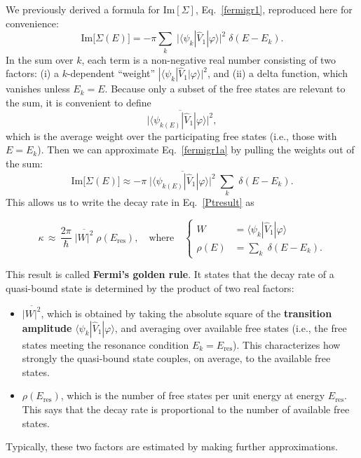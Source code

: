 \documentclass[prx,12pt]{revtex4-2}
\begin{document}
We previously derived a formula for $\mathrm{Im}[\Sigma]$,
Eq.~\eqref{fermigr1}, reproduced here for convenience:
\begin{equation}
  \mathrm{Im}\big[\Sigma(E)\big]
  = - \pi \sum_k \; \big| \langle\psi_k| \hat{V}_1|\varphi\rangle\big|^2
  \; \delta(E-E_k).
  \label{fermigr1a}
\end{equation}
In the sum over $k$, each term is a non-negative real number
consisting of two factors: (i) a $k$-dependent ``weight'' $|
\langle\psi_k| \hat{V}_1|\varphi\rangle|^2$, and (ii) a delta
function, which vanishes unless $E_k = E$.  Because only a subset of
the free states are relevant to the sum, it is convenient to define
\begin{equation*}
  \overline{\big| \langle\psi_{k(E)}| \hat{V}_1|\varphi\rangle\big|^2},
\end{equation*}
which is the average weight over the participating free states (i.e.,
those with $E = E_k$).  Then we can approximate Eq.~\eqref{fermigr1a}
by pulling the weights out of the sum:
\begin{equation}
  \mathrm{Im}\big[\Sigma(E)\big]
  \approx - \pi \;
  \overline{\big| \langle\psi_{k(E)}| \hat{V}_1|\varphi\rangle\big|^2}
  \; \sum_k \; \delta(E-E_k).
  \label{fermigr2}
\end{equation}
This allows us to write the decay rate in Eq.~\eqref{Ptresult} as
\begin{framed}
  \begin{equation}
    \kappa
    \,\approx\, \frac{2\pi}{\hbar} \;
    \overline{\big|W\big|^2} \; \rho(E_{\mathrm{res}}),
    \quad \mathrm{where} \quad \left\{
    \begin{aligned}
      W &= \langle\psi_{k}| \hat{V}_1|\varphi\rangle \\
      \rho(E) &= \sum_k \; \delta(E-E_k).
    \end{aligned}\right.
    \label{FGR}
  \end{equation}
\end{framed}
\vskip -0.1in
\noindent
This result is called \textbf{Fermi's golden rule}.  It states that
the decay rate of a quasi-bound state is determined by the product of
two real factors:

\begin{itemize}
\item
  $\overline{|W|^2}$, which is obtained by taking the absolute square
  of the \textbf{transition amplitude} $\langle\psi_{k}|
  \hat{V}_1|\varphi\rangle$, and averaging over available free states
  (i.e., the free states meeting the resonance condition $E_k =
  E_{\mathrm{res}}$).  This characterizes how strongly the quasi-bound
  state couples, on average, to the available free states.

\item
  $\rho(E_{\mathrm{res}})$, which is the number of free states per
  unit energy at energy $E_{\mathrm{res}}$.  This says that the decay
  rate is proportional to the number of available free states.
\end{itemize}
\vskip -0.1in
\noindent
Typically, these two factors are estimated by making further
approximations.
\end{document}
